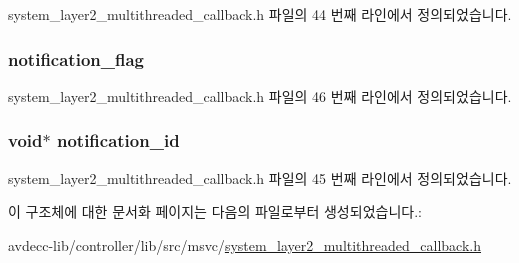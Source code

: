 system\+\_\+layer2\+\_\+multithreaded\+\_\+callback.\+h 파일의 44 번째 라인에서 정의되었습니다.

\subsubsection[{\texorpdfstring{notification\+\_\+flag}{notification_flag}}]{ notification\+\_\+flag}\hypertarget{structavdecc__lib_1_1system__layer2__multithreaded__callback_1_1poll__thread__data_a01e6e66d891af833ee1998e9309623cd}{}\label{structavdecc__lib_1_1system__layer2__multithreaded__callback_1_1poll__thread__data_a01e6e66d891af833ee1998e9309623cd}


system\+\_\+layer2\+\_\+multithreaded\+\_\+callback.\+h 파일의 46 번째 라인에서 정의되었습니다.

\subsubsection[{\texorpdfstring{notification\+\_\+id}{notification_id}}]{\setlength{\rightskip}{0pt plus 5cm}void$\ast$ notification\+\_\+id}\hypertarget{structavdecc__lib_1_1system__layer2__multithreaded__callback_1_1poll__thread__data_a1efd7ce38af0ff90ffefd52133214023}{}\label{structavdecc__lib_1_1system__layer2__multithreaded__callback_1_1poll__thread__data_a1efd7ce38af0ff90ffefd52133214023}


system\+\_\+layer2\+\_\+multithreaded\+\_\+callback.\+h 파일의 45 번째 라인에서 정의되었습니다.



이 구조체에 대한 문서화 페이지는 다음의 파일로부터 생성되었습니다.\+:\begin{DoxyCompactItemize}
\item 
avdecc-\/lib/controller/lib/src/msvc/\hyperlink{msvc_2system__layer2__multithreaded__callback_8h}{system\+\_\+layer2\+\_\+multithreaded\+\_\+callback.\+h}\end{DoxyCompactItemize}
